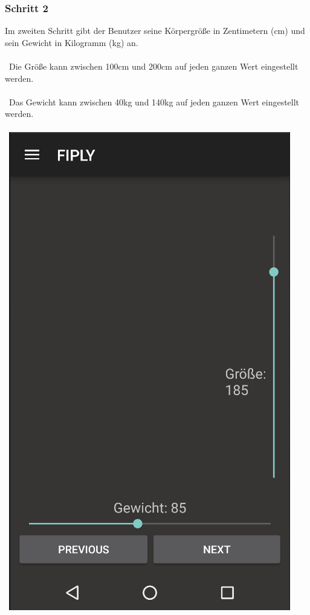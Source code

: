 \documentclass[FIPLY_base.tex]{subfiles}
\begin{document}
\subsubsection{Schritt 2}
Im zweiten Schritt gibt der Benutzer seine Körpergröße in Zentimetern (cm) und sein Gewicht in Kilogramm (kg) an.
\\\
\\\
Die Größe kann zwischen 100cm und 200cm auf jeden ganzen Wert eingestellt werden.
\\\
\\\
Das Gewicht kann zwischen 40kg und 140kg auf jeden ganzen Wert eingestellt werden.
\\\
\\\
\includegraphics[scale=0.4]{img/User_step2}
\newpage
\end{document}
